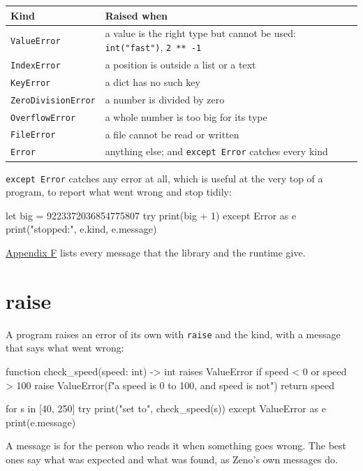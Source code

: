 \begin{center}
\begin{tabular}{lP{9cm}}
\toprule
Kind & Raised when \\
\midrule
\verb|ValueError| & a value is the right type but cannot be used:
  \verb|int("fast")|, \verb|2 ** -1| \\
\verb|IndexError| & a position is outside a list or a text \\
\verb|KeyError| & a dict has no such key \\
\verb|ZeroDivisionError| & a number is divided by zero \\
\verb|OverflowError| & a whole number is too big for its type \\
\verb|FileError| & a file cannot be read or written \\
\verb|Error| & anything else; and \verb|except Error| catches every kind \\
\bottomrule
\end{tabular}
\end{center}

\verb|except Error| catches any error at all, which is useful at the
very top of a program, to report what went wrong and stop tidily:

\begin{zeno}
let big = 9223372036854775807
try {
    print(big + 1)
} except Error as e {
    print("stopped:", e.kind, e.message)
}
\end{zeno}

\hyperref[app-error-kinds]{Appendix F} lists every message that the
library and the runtime give.

\section{raise}

A program raises an error of its own with \verb|raise| and the kind,
with a message that says what went wrong:

\begin{zeno}
function check_speed(speed: int) -> int raises ValueError {
    if speed < 0 or speed > 100 {
        raise ValueError(f"a speed is 0 to 100, and {speed} is not")
    }
    return speed
}

for s in [40, 250] {
    try {
        print("set to", check_speed(s))
    } except ValueError as e {
        print(e.message)
    }
}
\end{zeno}

A message is for the person who reads it when something goes wrong.
The best ones say what was expected and what was found, as Zeno's own
messages do.

